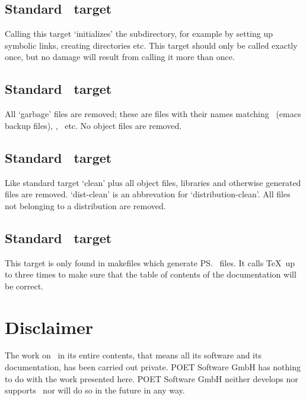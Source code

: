 \subsection*{Standard \protect{}\ target \protect{}}

Calling this target `initializes' the subdirectory, for example by
setting up symbolic links, creating directories etc. This target
should only be called exactly once, but no damage will result from
calling it more than once.

\subsection*{Standard \protect{}\ target \protect{}}

All `garbage' files are removed; these are files with their names
matching \lisp{*\td}\ (emacs backup files), , \
etc. No object files are removed.

\subsection*{Standard \protect{}\ target \protect{}}

Like standard target `clean' plus all object files, libraries and
otherwise generated files are removed. `dist-clean' is an abbrevation
for `distribution-clean'. All files not belonging to a distribution
are removed.

\subsection*{Standard \protect{}\ target \protect{}}

This target is only found in makefiles which generate \ps\ files.
It calls \TeX\ up to three times to make sure that the table of
contents of the documentation will be correct.

\section{Disclaimer}

The work on \plob\ in its entire contents, that means all its software
and its documentation, has been carried out private.  POET Software
GmbH has nothing to do with the work presented here. POET Software
GmbH neither develops nor supports \plob\ nor will do so in the future
in any way.

